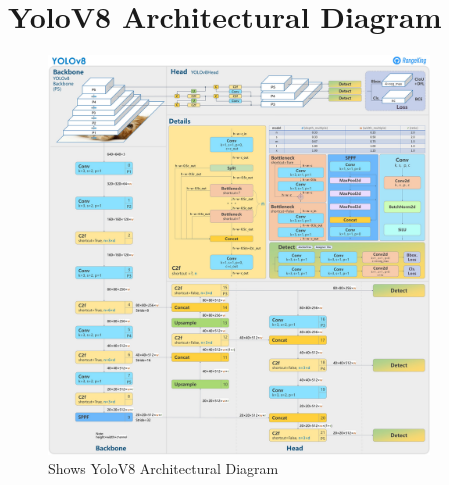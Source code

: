 \documentclass[12 pt]{report}
\begin{document}
\section{YoloV8 Architectural Diagram}
\begin{figure}[h]
  \centering
  \includegraphics[width=0.9\textwidth]{Yolov8_Arch.png}
  \caption{Shows YoloV8 Architectural Diagram}
  \label{fig:function_block_diagram}
\end{figure}
\end{document}
